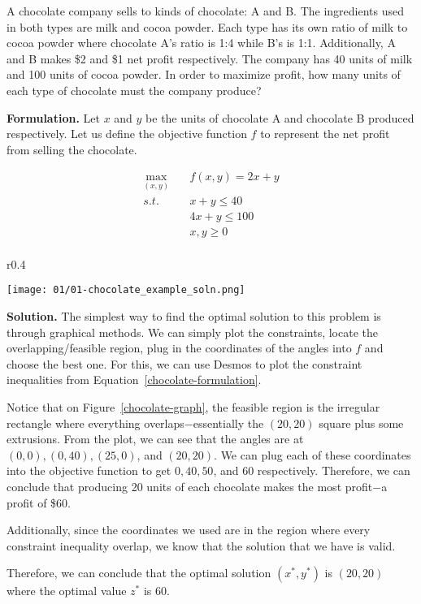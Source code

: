 \begin{example}
A chocolate company sells to kinds of chocolate: A and B. The 
ingredients used in both types are milk and cocoa powder. Each type 
has its own ratio of milk to cocoa powder where chocolate A's ratio 
is 1:4 while B's is 1:1. Additionally, A and B makes \$2 and \$1 
net profit respectively. The company has 40 units of milk and 100 units 
of cocoa powder. In order to maximize profit, how many units of each 
type of chocolate must the company produce?

\textbf{Formulation. } Let $x$ and $y$ be the units of chocolate A and chocolate B
produced respectively. Let us define the objective function $f$ to represent the 
net profit from selling the chocolate.

\begin{equation}\label{chocolate-formulation}
\begin{aligned}
    \max_{(x, y)} \quad &f(x, y) = 2x + y\\
    s.t. \quad & x + y \leq 40\\
    & 4x + y \leq 100\\
    & x, y \geq 0\\
\end{aligned}
\end{equation}

\begin{wrapfigure}{r}{0.4\textwidth}
    \begin{center}
        \texttt{[image: 01/01-chocolate\_example\_soln.png]}
    \end{center}
    \caption{Graph from Desmos}\label{chocolate-graph}
\end{wrapfigure}
\textbf{Solution. } The simplest way to find the optimal solution to this problem
is through graphical methods. We can simply plot the constraints, locate the
overlapping/feasible region, plug in the coordinates of the angles
into $f$ and choose the best one. For this, we can use Desmos to plot the constraint
inequalities from Equation~\ref{chocolate-formulation}.

Notice that on Figure~\ref{chocolate-graph}, the feasible region is the irregular
rectangle where everything overlaps$-$essentially the $(20, 20)$ square plus some 
extrusions. From the plot, we can see that the angles are at $(0, 0), (0, 40), (25, 0)$,
and $(20, 20)$. We can plug each of these coordinates into the objective function 
to get $0, 40, 50$, and $60$ respectively. Therefore, we can conclude that producing 
20 units of each chocolate makes the most profit$-$a profit of \$60.

Additionally, since the coordinates we used are in the region where every constraint 
inequality overlap, we know that the solution that we have is valid.

Therefore, we can conclude that the optimal solution $(x^*, y^*)$ is $(20, 20)$ where
the optimal value $z^*$ is $60$.
\end{example}

